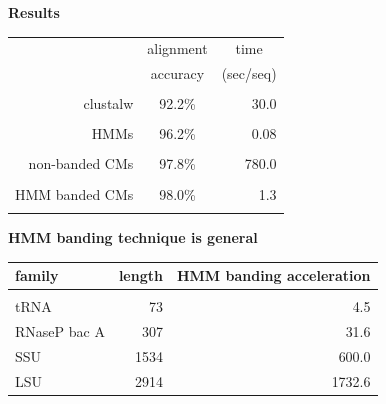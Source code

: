 \documentclass[landscape]{slides}
\begin{document}
\begin{slide}
\begin{center}
\large
\textbf{Results}
\end{center}
\medskip
\medskip
\begin{center}

\begin{tabular}{rcr} 
& \multicolumn{1}{c}{alignment} & \multicolumn{1}{c}{time} \\
& \multicolumn{1}{c}{accuracy} & \multicolumn{1}{c}{(sec/seq)} \\ \hline
& \multicolumn{1}{c}{} & \multicolumn{1}{c}{} \\
clustalw & 92.2\% & 30.0 \\ 
& \multicolumn{1}{c}{} & \multicolumn{1}{c}{} \\
HMMs & 96.2\% & 0.08 \\ 
& \multicolumn{1}{c}{} & \multicolumn{1}{c}{} \\
non-banded CMs & 97.8\% & 780.0 \\ 
& \multicolumn{1}{c}{} & \multicolumn{1}{c}{} \\
HMM banded CMs & 98.0\% & 1.3 \\ %
& \multicolumn{1}{c}{} & \multicolumn{1}{c}{} \\
\end{tabular}
\end{center}

\begin{center}
\large
\textbf{HMM banding technique is general}
\end{center}


\small
\begin{center}
\begin{tabular}{lrr} 
  family & length & HMM banding acceleration \\ \hline
  \\
  tRNA   & 73     & 4.5 \\
  RNaseP bac A & 307 & 31.6 \\
  SSU & 1534 & 600.0 \\ %
  LSU & 2914 & 1732.6 \\ %
\end{tabular}
\end{center}

\vfill
\end{slide}
\end{document}
